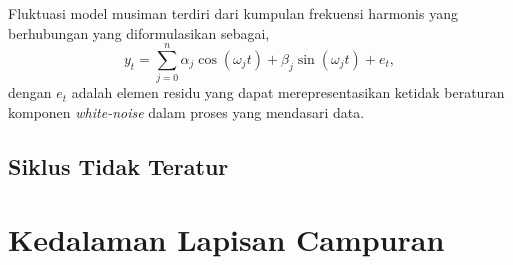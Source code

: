 \begin{spacing}{1.5}
	Fluktuasi model musiman terdiri dari kumpulan frekuensi harmonis yang berhubungan yang diformulasikan sebagai,
	\begin{equation}
		y_t = \sum_{j=0}^{n}{\alpha_j\cos(\omega_j t)+\beta_j\sin(\omega_j t)}+e_t,
	\end{equation}
	dengan $e_t$ adalah elemen residu yang dapat merepresentasikan ketidak beraturan komponen \textit{white-noise} dalam proses yang mendasari data.
	
\subsection[Siklus Tidak Teratur]{Siklus Tidak Teratur}
\end{spacing}
\vspace{-0.1pc}
\section[Kedalaman Lapisan Campuran]{Kedalaman Lapisan Campuran}
